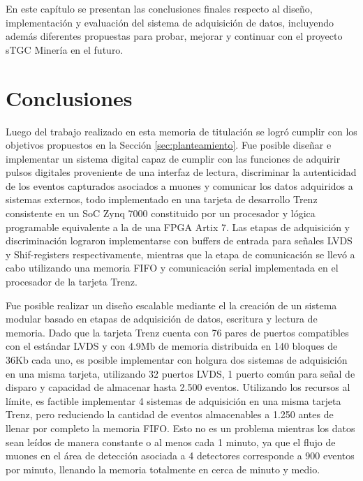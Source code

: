 
En este capítulo se presentan las conclusiones finales respecto al diseño, implementación y evaluación del sistema de adquisición de datos, incluyendo además diferentes propuestas para probar, mejorar y continuar con el proyecto sTGC Minería en el futuro.

\section{Conclusiones}
\label{sec:conc}

Luego del trabajo realizado en esta memoria de titulación se logró cumplir con los objetivos propuestos en la Sección \ref{sec:planteamiento}. Fue posible diseñar e implementar un sistema digital capaz de cumplir con las funciones de adquirir pulsos digitales proveniente de una interfaz de lectura, discriminar la autenticidad de los eventos capturados asociados a muones y comunicar los datos adquiridos a sistemas externos, todo implementado en una tarjeta de desarrollo Trenz consistente en un SoC Zynq 7000 constituido por un procesador y lógica programable equivalente a la de una FPGA Artix 7. Las etapas de adquisición y discriminación lograron implementarse con buffers de entrada para señales LVDS y Shif-registers respectivamente, mientras que la etapa de comunicación se llevó a cabo utilizando una memoria FIFO y comunicación serial implementada en el procesador de la tarjeta Trenz.

Fue posible realizar un diseño escalable mediante el la creación de un sistema modular basado en etapas de adquisición de datos, escritura y lectura de memoria. Dado que la tarjeta Trenz cuenta con 76 pares de puertos compatibles con el estándar LVDS y con 4.9Mb de memoria distribuida en 140 bloques de 36Kb cada uno, es posible implementar con holgura dos sistemas de adquisición en una misma tarjeta, utilizando 32 puertos LVDS, 1 puerto común para señal de disparo y capacidad de almacenar hasta 2.500 eventos. Utilizando los recursos al límite, es factible implementar 4 sistemas de adquisición en una misma tarjeta Trenz, pero reduciendo la cantidad de eventos almacenables a 1.250 antes de llenar por completo la memoria FIFO. Esto no es un problema mientras los datos sean leídos de manera constante o al menos cada 1 minuto, ya que el flujo de muones en el área de detección asociada a 4 detectores corresponde a 900 eventos por minuto, llenando la memoria totalmente en cerca de minuto y medio.

